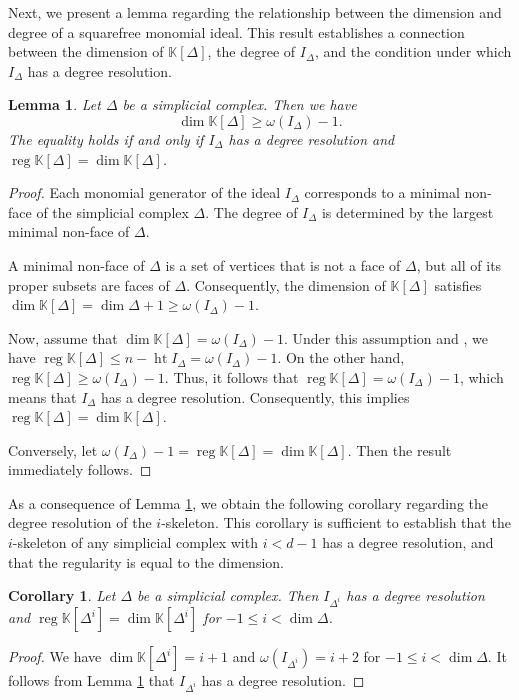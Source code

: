 \documentclass[a4paper,12pt]{amsart}
\numberwithin{equation}{section}
\newtheorem{lemma}[theorem]{Lemma}
\newtheorem{corollary}[theorem]{Corollary}
\theoremstyle{definition}
\newcommand{\K}[0]{\mathbb{K}}
\DeclareMathOperator{\reg}{reg}
\DeclareMathOperator{\hte}{ht}
\begin{document}
Next, we present a lemma regarding the relationship between the dimension and degree of a squarefree monomial ideal. This result establishes a connection between the dimension of $\K[\Delta]$, the degree of $I_{\Delta}$, and the condition under which $I_{\Delta}$ has a degree resolution.
\begin{lemma}\label{dimension degree}
	Let $\Delta$ be a simplicial complex. Then we have
	$$\dim\K[\Delta]\ge\omega(I_{\Delta})-1.$$
	The equality holds if and only if $I_{\Delta}$ has a degree resolution and $\reg\K[\Delta]=\dim\K[\Delta]$.
\end{lemma}
\begin{proof}
	Each monomial generator of the ideal $I_{\Delta}$ corresponds to a minimal non-face of the simplicial complex $\Delta$. The degree of $I_{\Delta}$ is determined by the largest minimal non-face of $\Delta$.
	
	A minimal non-face of $\Delta$ is a set of vertices that is not a face of $\Delta$, but all of its proper subsets are faces of $\Delta$. Consequently, the dimension of $\K[\Delta]$ satisfies $\dim\K[\Delta]=\dim\Delta+1\geq\omega(I_{\Delta})-1$.
	
	Now, assume that $\dim\K[\Delta]=\omega(I_{\Delta})-1$. Under this assumption and \cite[Theorem 3.1]{HoaTrung1998}, we have $\reg\K[\Delta]\le n-\hte I_{\Delta}=\omega(I_{\Delta})-1$. On the other hand, $\reg\K[\Delta]\ge\omega(I_\Delta)-1$. Thus, it follows that $\reg\K[\Delta]=\omega(I_{\Delta})-1$, which means that $I_{\Delta}$ has a degree resolution. Consequently, this implies $\reg\K[\Delta]=\dim\K[\Delta]$.
	
	Conversely, let $\omega(I_{\Delta})-1=\reg\K[\Delta]=\dim\K[\Delta]$. Then the result immediately follows.
\end{proof}

As a consequence of Lemma \ref{dimension degree}, we obtain the following corollary regarding the degree resolution of the $i$-skeleton. This corollary is sufficient to establish that the $i$-skeleton of any simplicial complex with $i<d-1$ has a degree resolution, and that the regularity is equal to the dimension.

\begin{corollary}\label{skeleton degree resolution}
	Let $\Delta$ be a simplicial complex. Then $I_{\Delta^i}$ has a degree resolution and $\reg\K[\Delta^i]=\dim\K[\Delta^i]$ for $-1\le i<\dim\Delta$.
\end{corollary}
\begin{proof}
	We have $\dim\K[\Delta^i]=i+1$ and $\omega(I_{\Delta^i})=i+2$ for $-1\le i<\dim\Delta$. It follows from Lemma \ref{dimension degree} that $I_{\Delta^i}$ has a degree resolution.
\end{proof}
\end{document}
